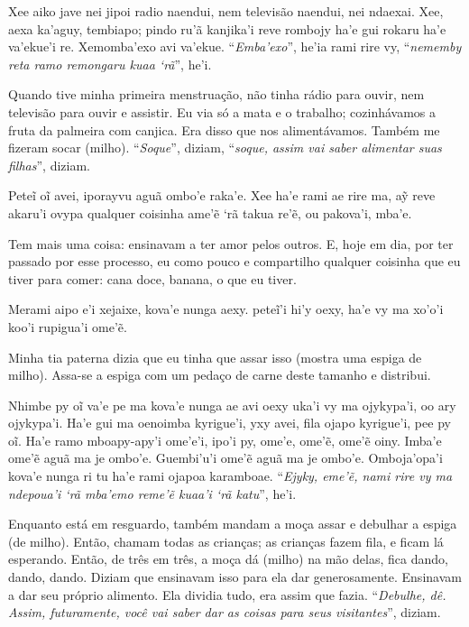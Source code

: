 \begin{paracol}{2}
\footnotesize
Xee aiko jave nei jipoi radio naendui, nem televisão naendui, nei
ndaexai. Xee, aexa ka'aguy, tembiapo; pindo ru'ã kanjika'i reve rombojy
ha'e gui rokaru ha'e va'ekue'i re. Xemomba'exo avi va'ekue.
``\emph{Emba'exo}'', he'ia rami rire vy, ``\emph{nememby reta ramo
remongaru kuaa `rã}'', he'i.  

\switchcolumn
Quando tive minha primeira menstruação, não tinha rádio para ouvir, nem
televisão para ouvir e assistir. Eu via só a mata e o trabalho;
cozinhávamos a fruta da palmeira com canjica. Era disso que nos
alimentávamos. Também me fizeram socar (milho). ``\emph{Soque}'',
diziam, ``\emph{soque, assim vai saber alimentar suas filhas}'', diziam.

\switchcolumn
Peteĩ oĩ avei, iporayvu aguã ombo'e raka'e. Xee ha'e rami ae rire ma, aỹ
reve akaru'i ovypa qualquer coisinha ame'ẽ `rã takua re'ẽ, ou pakova'i,
mba'e.

\switchcolumn
Tem mais uma coisa: ensinavam a ter amor pelos outros. E, hoje em dia,
por ter passado por esse processo, eu como pouco e compartilho qualquer
coisinha que eu tiver para comer: cana doce, banana, o que eu tiver. 

\switchcolumn
Merami aipo e'i xejaixe, kova'e nunga aexy. peteĩ'i hi'y oexy, ha'e vy
ma xo'o'i koo'i rupigua'i ome'ẽ.

\switchcolumn
Minha tia paterna dizia que eu tinha que assar isso (mostra uma espiga
de milho). Assa-se a espiga com um pedaço de carne deste tamanho e
distribui.

\switchcolumn
Nhimbe py oĩ va'e pe ma kova'e nunga ae avi oexy uka'i vy ma ojykypa'i,
oo ary ojykypa'i. Ha'e gui ma oenoimba kyrigue'i, yxy avei, fila ojapo
kyrigue'i, pee py oĩ. Ha'e ramo mboapy-apy'i ome'e'i, ipo'i py, ome'e,
ome'ẽ, ome'ẽ oiny. Imba'e ome'ẽ aguã ma je ombo'e. Guembi'u'i ome'ẽ aguã
ma je ombo'e. Omboja'opa'i kova'e nunga ri tu ha'e rami ojapoa
karamboae. ``\emph{Ejyky, eme'ẽ, nami rire vy ma ndepoua'i `rã mba'emo
reme'ẽ kuaa'i `rã katu}'', he'i.

\switchcolumn
Enquanto está em resguardo, também mandam a moça assar e debulhar a
espiga (de milho). Então, chamam todas as crianças; as crianças fazem
fila, e ficam lá esperando. Então, de três em três, a moça dá (milho) na
mão delas, fica dando, dando, dando. Diziam que ensinavam isso para ela
dar generosamente. Ensinavam a dar seu próprio alimento. Ela dividia
tudo, era assim que fazia. ``\emph{Debulhe, dê. Assim, futuramente, você
vai saber dar as coisas para seus visitantes}'', diziam. 


\end{paracol}
